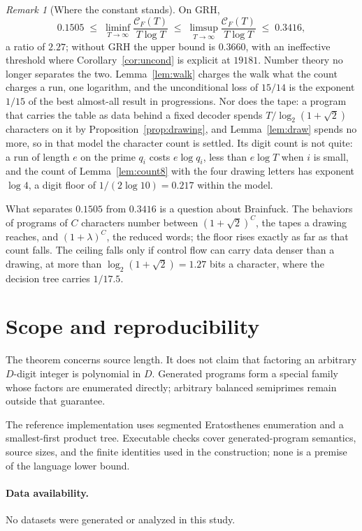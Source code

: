 \documentclass[11pt]{article}
\theoremstyle{remark}
\newtheorem{remark}[theorem]{Remark}
\newcommand{\CF}{\mathcal C_F}
\begin{document}
\begin{remark}[Where the constant stands]\label{rem:gap}
On GRH,
\[
  0.1505\;\le\;\liminf_{T\to\infty}\frac{\CF(T)}{T\log T}
  \;\le\;\limsup_{T\to\infty}\frac{\CF(T)}{T\log T}\;\le\;0.3416,
\]
a ratio of $2.27$; without GRH the upper bound is $0.3660$, with an
ineffective threshold where Corollary~\ref{cor:uncond} is explicit at $19181$.  Number theory
no longer separates the two.  Lemma~\ref{lem:walk} charges the walk what
the count charges a run, one logarithm, and the unconditional loss of
$15/14$ is the exponent $1/15$ of the best almost-all result in
progressions.  Nor does the tape: a program that carries the table as data
behind a fixed decoder spends $T/\log_2(1+\sqrt2)$ characters on it by
Proposition~\ref{prop:drawing}, and Lemma~\ref{lem:draw} spends no more, so
in that model the character count is settled.  Its digit count is not quite:
a run of length $e$ on the prime $q_i$ costs $e\log q_i$, less than
$e\log T$ when $i$ is small, and the count of Lemma~\ref{lem:count8} with
the four drawing letters has exponent $\log4$, a digit floor of
$1/(2\log10)=0.217$ within the model.

What separates $0.1505$ from $0.3416$ is a question about Brainfuck.  The
behaviors of programs of $C$ characters number between $(1+\sqrt2)^{C}$,
the tapes a drawing reaches, and $(1+\lambda)^{C}$, the reduced words; the
floor rises exactly as far as that count falls.  The ceiling falls only if
control flow can carry data denser than a drawing, at more than
$\log_2(1+\sqrt2)=1.27$ bits a character, where the decision tree carries
$1/17.5$.
\end{remark}

\section{Scope and reproducibility}

The theorem concerns source length.  It does not claim that factoring an
arbitrary $D$-digit integer is polynomial in $D$.  Generated programs form a
special family whose factors are enumerated directly; arbitrary balanced
semiprimes remain outside that guarantee.

The reference implementation uses segmented Eratosthenes enumeration and a
smallest-first product tree.  Executable checks cover generated-program
semantics, source sizes, and the finite identities used in the construction;
none is a premise of the language lower bound.

\paragraph{Data availability.}
No datasets were generated or analyzed in this study.
\end{document}
